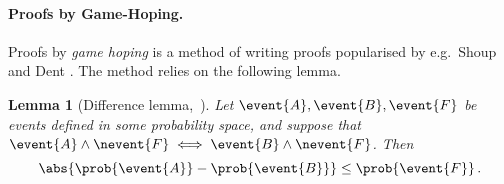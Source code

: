 \let\accentvec\vec \documentclass[runningheads,10pt]{llncs}
\newtheorem{lemma}[theorem]{Lemma}
\begin{document}
\paragraph{Proofs by Game-Hoping.}
Proofs by \emph{game hoping} is a method of writing proofs popularised by e.g.~Shoup \cite{EPRINT:Shoup04} and Dent \cite{EPRINT:Dent06c}. The method relies on the following lemma.

\begin{lemma}[Difference lemma,~{\cite[Lemma 1]{EPRINT:Shoup04}}]
	\label{lem:difference_lemma}
	Let $\event{A}, \event{B}, \event{F}$ be events defined in some probability
	space, and suppose that $\event{A} \land \nevent{F} \iff \event{B}
		\land \nevent{F}$.  Then 
	\[
		\abs{\prob{\event{A}} - \prob{\event{B}}} \leq \prob{\event{F}}\,.
	\]
\end{lemma}
\end{document}
